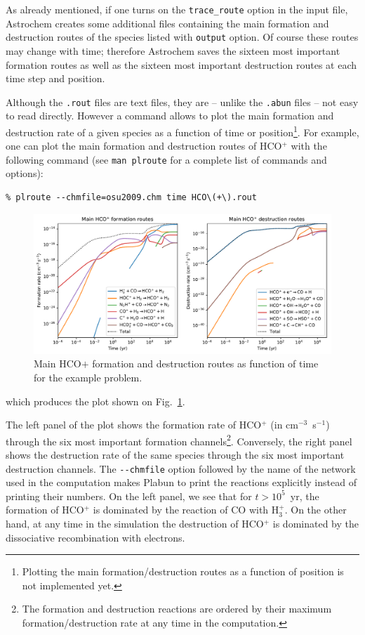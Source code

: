 \documentclass[a4paper,12pt]{article}
\begin{document}
As already mentioned, if one turns on the \verb=trace_route= option
in the input file, Astrochem creates some additional files containing
the main formation and destruction routes of the species listed with
\verb=output= option. Of course these routes may change with time;
therefore Astrochem saves the sixteen most important formation routes
as well as the sixteen most important destruction routes at each time
step and position.

Although the \verb=.rout= files are text files, they are -- unlike
the \verb=.abun= files -- not easy to read directly. However a command
allows to plot the main formation and destruction rate of a given
species as a function of time or position\footnote{Plotting the main
  formation/destruction routes as a function of position is not
  implemented yet.}. For example, one can plot the main formation and
destruction routes of HCO$^{+}$ with the following command (see
\verb=man plroute= for a complete list of commands and options):

\begin{verbatim}
% plroute --chmfile=osu2009.chm time HCO\(+\).rout
\end{verbatim}

\begin{figure}
  \begin{center}
    \includegraphics[width=\columnwidth]{fig2.pdf}
  \end{center}
  \caption{Main HCO${+}$ formation and destruction routes as function
    of time for the example problem.}
  \label{fig:example-routes}
\end{figure}

\noindent
which produces the plot shown on Fig.~\ref{fig:example-routes}.

The left panel of the plot shows the formation rate of HCO$^{+}$ (in
cm$^{-3}$~s$^{-1}$) through the six most important formation
channels\footnote{The formation and destruction reactions are ordered
  by their maximum formation/destruction rate at any time in the
  computation.}. Conversely, the right panel shows the destruction
rate of the same species through the six most important destruction
channels. The \verb=--chmfile= option followed by the name of the
network used in the computation makes Plabun to print the reactions
explicitly instead of printing their numbers. On the left panel, we
see that for $t > 10^{5}$~yr, the formation of HCO$^{+}$ is dominated
by the reaction of CO with H$_{3}^{+}$. On the other hand, at any time
in the simulation the destruction of HCO$^{+}$ is dominated by the
dissociative recombination with electrons.
\end{document}
